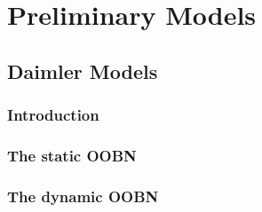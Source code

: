 \section{Preliminary Models}
\subsection{Daimler Models}

\subsubsection*{Introduction}

\subsubsection*{The static OOBN}



\subsubsection*{The dynamic OOBN}

